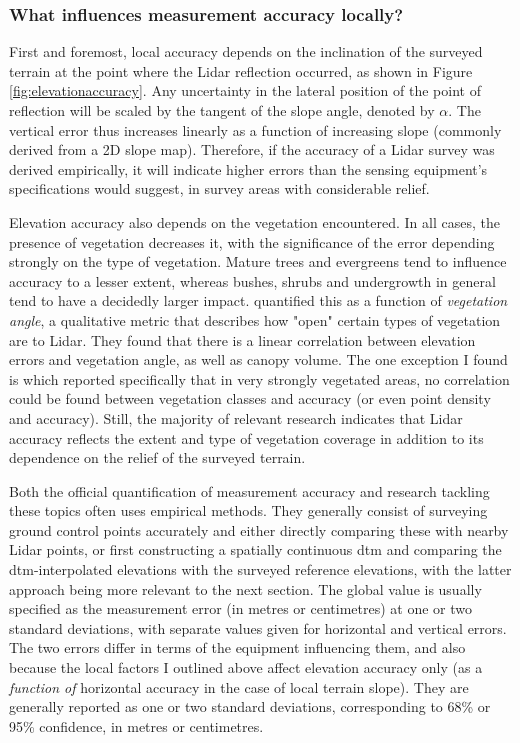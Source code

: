 \subsubsection{What influences measurement accuracy locally?}

First and foremost, local accuracy depends on the inclination of the surveyed terrain at the point where the Lidar reflection occurred, as shown in Figure \ref{fig:elevationaccuracy}. Any uncertainty in the lateral position of the point of reflection will be scaled by the tangent of the slope angle, denoted by $\alpha$. The vertical error thus increases linearly as a function of increasing slope (commonly derived from a 2D slope map). Therefore, if the accuracy of a Lidar survey was derived empirically, it will indicate higher errors than the sensing equipment's specifications would suggest, in survey areas with considerable relief.

Elevation accuracy also depends on the vegetation encountered. In all cases, the presence of vegetation decreases it, with the significance of the error depending strongly on the type of vegetation. Mature trees and evergreens tend to influence accuracy to a lesser extent, whereas bushes, shrubs and undergrowth in general tend to have a decidedly larger impact. \cite{peng_shih_2006} quantified this as a function of \textit{vegetation angle}, a qualitative metric that describes how "open" certain types of vegetation are to Lidar. They found that there is a linear correlation between elevation errors and vegetation angle, as well as canopy volume. The one exception I found is \cite{raber_etal_2007} which reported specifically that in very strongly vegetated areas, no correlation could be found between vegetation classes and accuracy (or even point density and accuracy). Still, the majority of relevant research indicates that Lidar accuracy reflects the extent and type of vegetation coverage in addition to its dependence on the relief of the surveyed terrain.

Both the official quantification of measurement accuracy and research tackling these topics often uses empirical methods. They generally consist of surveying ground control points accurately and either directly comparing these with nearby Lidar points, or first constructing a spatially continuous \ac{dtm} and comparing the \ac{dtm}-interpolated elevations with the surveyed reference elevations, with the latter approach being more relevant to the next section. The global value is usually specified as the measurement error (in metres or centimetres) at one or two standard deviations, with separate values given for horizontal and vertical errors. The two errors differ in terms of the equipment influencing them, and also because the local factors I outlined above affect elevation accuracy only (as a \textit{function of} horizontal accuracy in the case of local terrain slope). They are generally reported as one or two standard deviations, corresponding to 68\% or 95\% confidence, in metres or centimetres.

